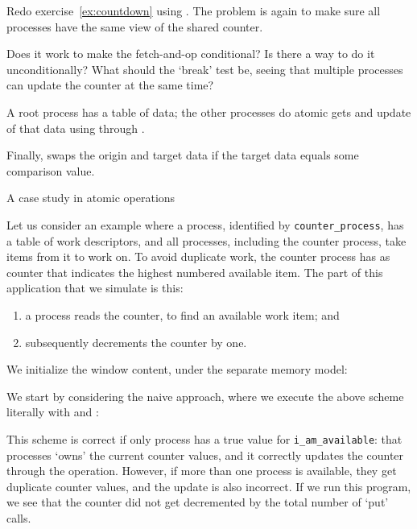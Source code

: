 \begin{exercise}
  \label{ex:countdownop}
  Redo exercise~\ref{ex:countdown} using . The
  problem is again to make sure all processes have the same view of
  the shared counter.

  Does it work to make the fetch-and-op conditional? Is there a way to
  do it unconditionally? What should the `break' test be, seeing that
  multiple processes can update the counter at the same time?
\end{exercise}

\begin{example}
  A root process has a table of data; the other processes do 
  atomic gets and update of that data using
   through .
\end{example}

Finally,  swaps the origin and
target data if the target data equals some comparison value.

 {A case study in atomic operations}

Let us consider an example where a process,
identified by \lstinline+counter_process+,
has a table of work descriptors,
and all processes, including the counter process,
take items from it to work on.
To avoid duplicate work, the counter process has as counter
that indicates the highest numbered available item.
The part of this application that we simulate is this:
\begin{enumerate}
\item a process reads the counter, to find an available work item; and
\item subsequently decrements the counter by one.
\end{enumerate}

We initialize the window content, under the separate memory model:
%

We start by considering the naive approach, where we execute the above scheme
literally with  and :
%

This scheme is correct if only process
has a true value for \lstinline+i_am_available+:
that processes `owns' the current counter values,
and it correctly updates the counter
through the  operation.
However, if more than one process is available,
they get duplicate counter values, and the update
is also incorrect.
If we run this program, we see that the counter did not get
decremented by the total number of `put' calls.

